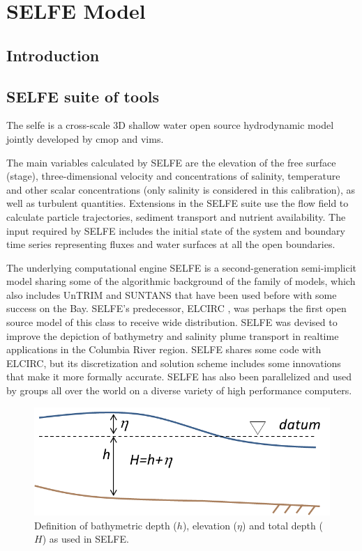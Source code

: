 \chapter{SELFE Model}
\label{chap:selfe}
\section{Introduction}
\section{SELFE suite of tools}
The \acrfull{selfe} \citep{Zhang08} is a cross-scale 3D shallow water open source hydrodynamic model jointly 
developed by \acrfull{cmop} and \acrfull{vims}.

The main variables calculated by SELFE are the elevation of the free surface (stage), 
three-dimensional velocity and concentrations of salinity,
temperature and other scalar concentrations (only salinity is considered in this calibration), as well as turbulent quantities. Extensions in the SELFE suite use the flow field to calculate particle trajectories, sediment transport and nutrient availability. The input required by SELFE includes the initial state of the system and boundary time series
 representing fluxes and water surfaces at all the open boundaries. 

The underlying computational engine SELFE is a second-generation semi-implicit model sharing some of the 
algorithmic background of the \cite{Casulli99} family of models, which also includes UnTRIM and SUNTANS that have been
used before with some success on the Bay. SELFE's predecessor, ELCIRC \citep{Zhang04}, was perhaps the first open source model of this class to receive wide distribution. SELFE was devised to improve the depiction of 
bathymetry and salinity plume transport in realtime applications in the Columbia River region. 
SELFE shares some code with ELCIRC, but its discretization and solution scheme includes some 
innovations that make it more formally accurate. SELFE has also been parallelized and used by groups all over the world on a diverse
variety of high performance computers.

\begin{figure}
	\centering
		\includegraphics[scale=1.0]{image/depth_definition}
	\caption{Definition of bathymetric depth ($h$), elevation ($\eta$) and total depth ($H$) as used in SELFE.}
	\label{fig:depths}
\end{figure}

